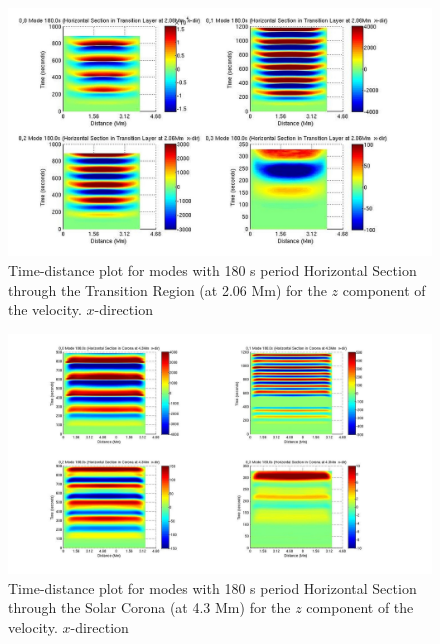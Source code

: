 \documentclass[preprint,authoryear,12pt]{elsarticle}
\begin{document}
\begin{figure}[h]
\includegraphics[scale=1]{imrescale/dt_180_horiz_x_2p06Mm.jpg}
\caption{Time-distance plot for modes with 180 s period Horizontal Section through the Transition Region (at 2.06 Mm) for the $z$  component of the velocity. $x$-direction}
\label{Fig15}
\end{figure}

\begin{figure}[h]
\includegraphics[scale=1]{imrescale/dt_180_horiz_x_4p3Mm.jpg}
\caption{Time-distance plot for modes with 180 s period Horizontal Section through the Solar Corona (at 4.3 Mm) for the $z$ component of the velocity. $x$-direction}
\label{Fig16}
\end{figure}
\end{document}

